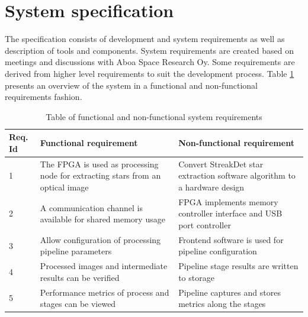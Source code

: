\documentclass[12pt]{report}
\begin{document}
\section{System specification}

The specification consists of development and system requirements as well as description of tools and components. System requirements are created based on meetings and discussions with Aboa Space Research Oy. Some requirements are derived from higher level requirements to suit the development process. Table \ref{table:1} presents an overview of the system in a functional and non-functional requirements fashion.

\begin{table}[h]
    \begin{tabular}{|p{1cm}|p{6.15cm}|p{6.15cm}|}
        \hline
        \textbf{Req. Id}& \textbf{Functional requirement}& \textbf{Non-functional requirement}\\
        \hline
        1&The FPGA is used as processing node for extracting stars from an optical image&Convert StreakDet star extraction software algorithm to a hardware design\\
        \hline
        2&A communication channel is available for shared memory usage&FPGA implements memory controller interface and USB port controller\\
        \hline
        3&Allow configuration of processing pipeline parameters&Frontend software is used for pipeline configuration\\
        \hline
        4&Processed images and intermediate results can be verified&Pipeline stage results are written to storage\\
        \hline
        5&Performance metrics of process and stages can be viewed&Pipeline captures and stores metrics along the stages\\
        \hline
    \end{tabular}
    \caption{Table of functional and non-functional system requirements}
    \label{table:1}
\end{table}

\end{document}
